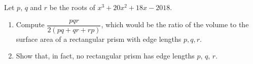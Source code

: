 Let $p$, $q$ and $r$ be the roots of $x^3+20x^2+18x-2018$.
\begin{enumerate}
\item[(a)] Compute $\dfrac{pqr}{2(pq+qr+rp)}$, which would be the ratio of the volume to the surface area of a rectangular prism with edge lengths $p,q,r$.
\item[(b)] Show that, in fact, no rectangular prism has edge lengths $p$, $q$, $r$.
\end{enumerate}
